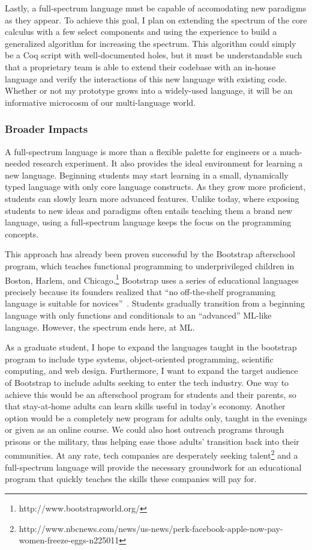 \documentclass[12pt]{article}
\begin{document}
Lastly, a full-spectrum language must be capable of accomodating new paradigms as they appear.
To achieve this goal, I plan on extending the spectrum of the core calculus with a few select components and using the experience to build a generalized algorithm for increasing the spectrum.
This algorithm could simply be a Coq script with well-documented holes, but it must be understandable such that a proprietary team is able to extend their codebase with an in-house language and verify the interactions of this new language with existing code.
Whether or not my prototype grows into a widely-used language, it will be an informative microcosm of our multi-language world.

\vspace{-0.2cm}
\subsubsection*{Broader Impacts}

A full-spectrum language is more than a flexible palette for engineers or a much-needed research experiment.
It also provides the ideal environment for learning a new language.
Beginning students may start learning in a small, dynamically typed language with only core language constructs.
As they grow more proficient, students can slowly learn more advanced features.
Unlike today, where exposing students to new ideas and paradigms often entails teaching them a brand new language, using a full-spectrum language keeps the focus on the programming concepts.

This approach has already been proven successful by the Bootstrap afterschool program, which teaches functional programming to underprivileged children in Boston, Harlem, and Chicago.\footnote{http://www.bootstrapworld.org/}
Bootstrap uses a series of educational languages precisely because its founders realized that ``no off-the-shelf programming language is suitable for novices''~\cite{felleisen2010teachscheme}.
Students gradually transition from a beginning language with only functions and conditionals to an ``advanced'' ML-like language.
However, the spectrum ends here, at ML.

As a graduate student, I hope to expand the languages taught in the bootstrap program to include type systems, object-oriented programming, scientific computing, and web design.
Furthermore, I want to expand the target audience of Bootstrap to include adults seeking to enter the tech industry.
One way to achieve this would be an afterschool program for students and their parents, so that stay-at-home adults can learn skills useful in today's economy.
Another option would be a completely new program for adults only, taught in the evenings or given as an online course.
We could also host outreach programs through prisons or the military, thus helping ease those adults' transition back into their communities.
At any rate, tech companies are desperately seeking talent\footnote{http://www.nbcnews.com/news/us-news/perk-facebook-apple-now-pay-women-freeze-eggs-n225011} and a full-spectrum language will provide the necessary groundwork for an educational program that quickly teaches the skills these companies will pay for.
\end{document}
